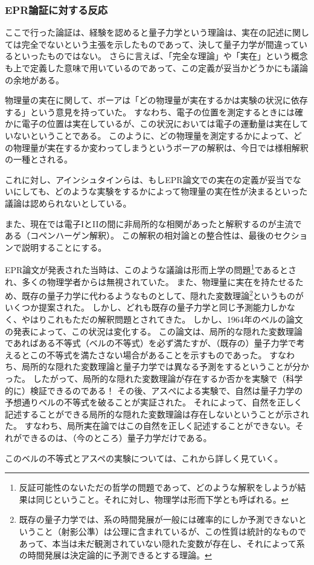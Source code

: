\documentclass[10pt,b5paper,papersize,dvipdfmx]{jsbook}
\begin{document}
%
\subsubsection{EPR論証に対する反応} %

ここで行った論証は、経験を認めると量子力学という理論は、実在の記述に関しては完全でないという主張を示したものであって、決して量子力学が間違っているといったものではない。
さらに言えば、「完全な理論」や「実在」という概念も上で定義した意味で用いているのであって、この定義が妥当かどうかにも議論の余地がある。\par
物理量の実在に関して、ボーアは「どの物理量が実在するかは実験の状況に依存する」という意見を持っていた。
すなわち、電子の位置を測定するときには確かに電子の位置は実在しているが、この状況においては電子の運動量は実在していないということである。
このように、どの物理量を測定するかによって、どの物理量が実在するか変わってしまうというボーアの解釈は、今日では様相解釈の一種とされる。\par
これに対し、アインシュタインらは、もしEPR論文での実在の定義が妥当でないにしても、どのような実験をするかによって物理量の実在性が決まるといった議論は認められないとしている。\par
また、現在では電子IとIIの間に非局所的な相関があったと解釈するのが主流である（コペンハーゲン解釈）。
この解釈の相対論との整合性は、最後のセクションで説明することにする。\par
EPR論文が発表された当時は、このような議論は形而上学の問題\footnote{
  反証可能性のないただの哲学の問題であって、どのような解釈をしようが結果は同じということ。それに対し、物理学は形而下学とも呼ばれる。
}であるとされ、多くの物理学者からは無視されていた。
また、物理量に実在を持たせるため、既存の量子力学に代わるようなものとして、隠れた変数理論\footnote{
  既存の量子力学では、系の時間発展が一般には確率的にしか予測できないということ（射影公準）は公理に含まれているが、この性質は統計的なものであって、本当は未だ観測されていない隠れた変数が存在し、それによって系の時間発展は決定論的に予測できるとする理論。
}というものがいくつか提案された。
しかし、どれも既存の量子力学と同じ予測能力しかなく、やはりこれもただの解釈問題とされてきた。
しかし、1964年のベルの論文の発表によって、この状況は変化する。
この論文は、局所的な隠れた変数理論であればある不等式（ベルの不等式）を必ず満たすが、（既存の）量子力学で考えるとこの不等式を満たさない場合があることを示すものであった。
すなわち、局所的な隠れた変数理論と量子力学では異なる予測をするということが分かった。
したがって、局所的な隠れた変数理論が存在するか否かを実験で（科学的に）検証できるのである！
その後、アスぺによる実験で、自然は量子力学の予想通りベルの不等式を破ることが実証された。
それによって、自然を正しく記述することができる局所的な隠れた変数理論は存在しないということが示された。
すなわち、局所実在論ではこの自然を正しく記述することができない。それができるのは、（今のところ）量子力学だけである。\par
このベルの不等式とアスペの実験については、これから詳しく見ていく。
\end{document}
